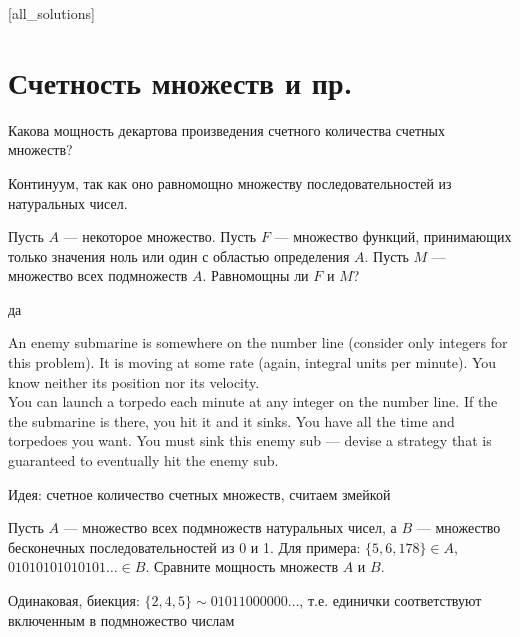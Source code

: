 [all_solutions]

\section{Счетность множеств и пр.}

\begin{problem}
Какова мощность декартова произведения счетного количества счетных множеств?

\begin{sol}
Континуум, так как оно равномощно множеству последовательностей из натуральных чисел.
\end{sol}
\end{problem}

\begin{problem}
Пусть $A$ — некоторое множество. Пусть $F$ — множество функций, принимающих только значения ноль или один с областью определения $A$. Пусть $M$ — множество всех подмножеств $A$. Равномощны ли $F$ и $M$?

\begin{sol}
да
\end{sol}
\end{problem}

\begin{problem}
 An enemy submarine is somewhere on the number line (consider only integers for this problem). It is moving at some rate (again, integral units per minute). You know neither its position nor its velocity.\\
You can launch a torpedo each minute at any integer on the number line. If the the submarine is there, you hit it and it sinks. You have all the time and torpedoes you want. You must sink this enemy sub — devise a strategy that is guaranteed to eventually hit the enemy sub.

\begin{sol}
Идея: счетное количество счетных множеств, считаем змейкой
\end{sol}
\end{problem}

\begin{problem}
Пусть $A$ — множество всех подмножеств натуральных чисел, а $ B $ — множество бесконечных последовательностей из 0 и 1. Для примера: $\{5,6,178\}\in A$, $01010101010101\ldots \in B$. Сравните мощность множеств $ A $ и $ B $.

\begin{sol}
Одинаковая, биекция: $\{2,4,5\}\sim 01011000000\ldots$, т.е. единички соответствуют включенным в подмножество числам
\end{sol}
\end{problem}

